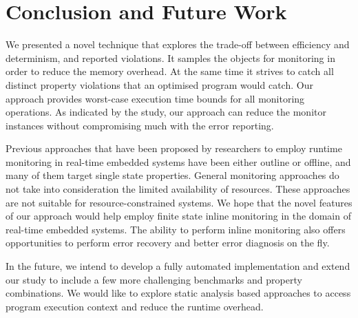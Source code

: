 \section{Conclusion and Future Work}
\label{sec:conclusion}

We presented a novel technique that explores the trade-off between efficiency and determinism, and reported violations. It samples the objects for monitoring in order to reduce the memory overhead. At the same time it strives to catch all distinct property violations that an optimised program would catch. Our approach provides worst-case execution time bounds for all monitoring operations.   As indicated by the study, our approach can reduce the monitor instances without compromising much with the error reporting.

Previous approaches that have been proposed by researchers to employ runtime monitoring in real-time embedded systems have been either outline or offline, and many of them target single state properties. General monitoring approaches do not take into consideration the limited availability of resources. These approaches are not suitable for resource-constrained systems. We hope that the novel features of our approach would help employ finite state inline monitoring in the domain of real-time embedded systems. The ability to perform inline monitoring also offers opportunities to perform error recovery and better error diagnosis on the fly.

In the future, we intend to develop a fully automated implementation and extend our study to include a few more challenging benchmarks and property combinations. We would like to explore static analysis based approaches to access program execution context and reduce the runtime overhead.
